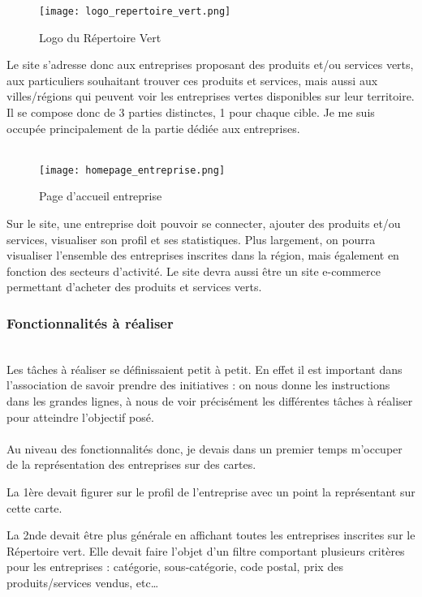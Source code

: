 \begin{figure}[H]
    \centering
    \texttt{[image: logo\_repertoire\_vert.png]}
    \caption{Logo du Répertoire Vert}
\end{figure}

Le site s'adresse donc aux entreprises proposant des produits et/ou services verts, aux particuliers souhaitant trouver ces produits et services, 
mais aussi aux villes/régions qui peuvent voir les entreprises vertes disponibles sur leur territoire. Il se compose donc de 3 parties distinctes, 1 pour chaque cible.
Je me suis occupée principalement de la partie dédiée aux entreprises.
\\\\
\begin{figure}[H]
    \centering
    \texttt{[image: homepage\_entreprise.png]}
    \caption{Page d'accueil entreprise}
\end{figure}


Sur le site, une entreprise doit pouvoir se connecter, ajouter des produits et/ou services, visualiser son profil et ses statistiques.
Plus largement, on pourra visualiser l'ensemble des entreprises inscrites dans la région, mais également en fonction des secteurs d'activité. Le site devra aussi être un site e-commerce permettant d'acheter des produits et services verts.

\subsubsection{Fonctionnalités à réaliser}
~\\
Les tâches à réaliser se définissaient petit à petit. En effet il est important dans l'association de savoir prendre des initiatives : 
on nous donne les instructions dans les grandes lignes, à nous de voir précisément les différentes tâches à réaliser pour atteindre l'objectif posé.
\\\\
Au niveau des fonctionnalités donc, je devais dans un premier temps m'occuper de la représentation des entreprises sur des cartes. 

La 1ère devait figurer sur le profil de l'entreprise avec un point la représentant sur cette carte.

La 2nde devait être plus générale en affichant toutes les entreprises inscrites sur le Répertoire vert. 
Elle devait faire l'objet d'un filtre comportant plusieurs critères pour les entreprises : catégorie, sous-catégorie, code postal, prix des produits/services vendus, etc\dots

